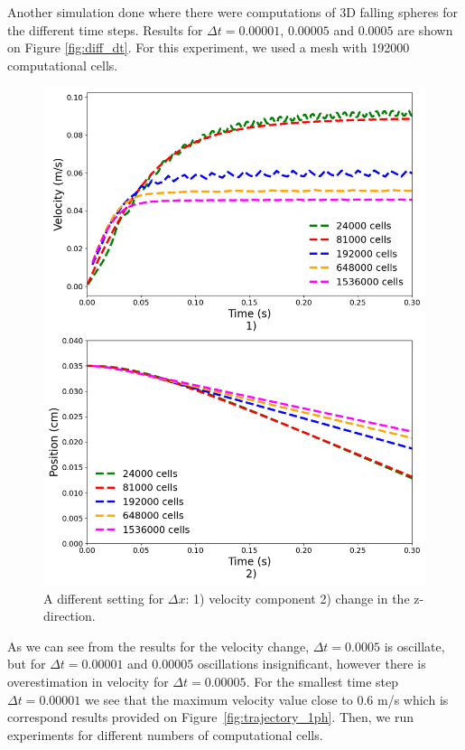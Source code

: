 Another simulation done where there were computations of 3D falling spheres for the different time steps. Results for $\Delta t = 0.00001$, $0.00005$ and $0.0005$ are shown on Figure \ref{fig:diff_dt}. For this experiment, we used a mesh with 192000 computational cells.
\begin{figure}[H]
    \centering
    \includegraphics[width=14cm]{ GWU_Thesis_Sarmakeeva/Images/chap3/nan_simulation_192000_diff_cells_number.png}
    \caption{A different setting for $\Delta x$: 1) velocity component 2) change in the z-direction.}
    \label{fig:cell_num}
\end{figure}
As we can see from the results for the velocity change, $\Delta t = 0.0005$ is oscillate, but for $\Delta t = 0.00001$ and $0.00005$ oscillations insignificant, however there is overestimation in velocity for $\Delta t = 0.00005$. For the smallest time step $\Delta t = 0.00001$ we see that the maximum velocity value close to $0.6$ m/s which is correspond results provided on Figure~\ref{fig:trajectory_1ph}. Then, we run experiments for different numbers of computational cells.

